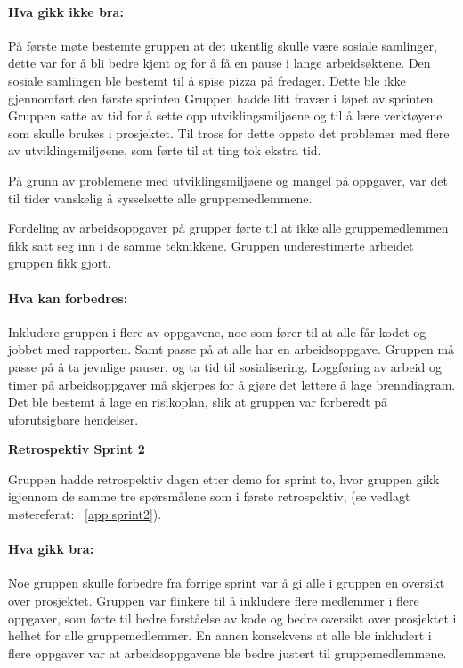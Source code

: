 \documentclass[12pt,a4paper,norsk]{article}
\begin{document}
\paragraph{Hva gikk ikke bra:}
På første møte bestemte gruppen at det ukentlig skulle være sosiale samlinger, dette var for å bli bedre kjent og for å få en pause i lange arbeidsøktene. Den sosiale samlingen ble bestemt til å spise pizza på fredager. Dette ble ikke gjennomført den første sprinten
Gruppen hadde litt fravær i løpet av sprinten.
Gruppen satte av tid for å sette opp utviklingsmiljøene og til å lære verktøyene som skulle brukes i prosjektet. Til tross for dette oppsto det problemer med flere av utviklingsmiljøene, som førte til at ting tok ekstra tid.

På grunn av problemene med utviklingsmiljøene og mangel på oppgaver, var det til tider vanskelig å sysselsette alle gruppemedlemmene.

Fordeling av arbeidsoppgaver på grupper førte til at ikke alle gruppemedlemmen fikk satt seg inn i de samme teknikkene.
Gruppen underestimerte arbeidet gruppen fikk gjort.


\paragraph{Hva kan forbedres:}
Inkludere gruppen i flere av oppgavene, noe som fører til at alle får kodet og jobbet med rapporten. Samt passe på at alle har en arbeidsoppgave.
Gruppen må passe på å ta jevnlige pauser, og ta tid til sosialisering.
Loggføring av arbeid og timer på arbeidsoppgaver må skjerpes for å gjøre det lettere å lage brenndiagram.
Det ble bestemt å lage en risikoplan, slik at gruppen var forberedt på uforutsigbare hendelser.


\bigskip \noindent \textbf{Retrospektiv Sprint 2}
\par Gruppen hadde retrospektiv dagen etter demo for sprint to, hvor gruppen gikk igjennom de samme tre spørsmålene som i første retrospektiv, (se vedlagt møtereferat: ~\cref{app:sprint2}).

\paragraph{Hva gikk bra:}
Noe gruppen skulle forbedre fra forrige sprint var å gi alle i gruppen en oversikt over prosjektet. Gruppen var flinkere til å inkludere flere medlemmer i flere oppgaver, som førte til bedre forståelse av kode og bedre oversikt over prosjektet i helhet for alle gruppemedlemmer. En annen konsekvens at alle ble inkludert i flere oppgaver var at arbeidsoppgavene ble bedre justert til gruppemedlemmene.
\end{document}
